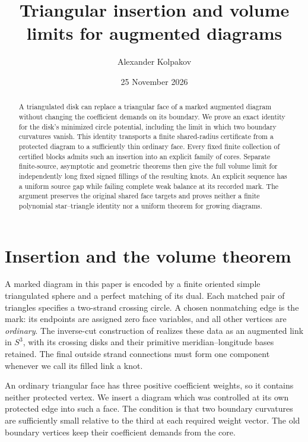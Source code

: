 \documentclass[11pt]{article}
\title{Triangular insertion and volume limits for augmented diagrams}
\author{Alexander Kolpakov}\date{25 November 2026}
\numberwithin{equation}{section}
\theoremstyle{definition}\newtheorem{definition}[theorem]{Definition}
\theoremstyle{remark}\newtheorem{remark}[theorem]{Remark}
\begin{document}
\maketitle
\begin{abstract}
A triangulated disk can replace a triangular face of a marked
augmented diagram without changing the coefficient demands on its
boundary. We prove an exact identity for the disk's minimized circle
potential, including the limit in which two boundary curvatures
vanish. This identity transports a finite shared-radius certificate
from a protected diagram to a sufficiently thin ordinary face.
Every fixed finite collection of certified blocks admits such an
insertion into an explicit family of cores. Separate finite-source,
asymptotic and geometric theorems then give the full volume limit for
independently long fixed signed fillings of the resulting knots.
An explicit sequence has a uniform source gap while failing complete
weak balance at its recorded mark. The argument preserves the
original shared face targets and proves neither a finite polynomial
star--triangle identity nor a uniform theorem for growing diagrams.
\end{abstract}

\section{Insertion and the volume theorem}

A marked diagram in this paper is encoded by a finite oriented simple
triangulated sphere and a perfect matching of its dual. Each matched
pair of triangles specifies a two-strand crossing circle. A chosen
nonmatching edge is the mark: its endpoints are assigned zero face
variables, and all other vertices are \emph{ordinary}. The inverse-cut
construction of \cite[Section 2 and Proposition 2.1]{Marked} realizes
these data as an augmented link in \(S^3\), with its crossing disks and
their primitive meridian--longitude bases retained. The final outside
strand connections must form one component whenever we call its
filled link a knot.

An ordinary triangular face has three positive coefficient weights,
so it contains neither protected vertex. We insert a diagram which was
controlled at its own protected edge into such a face. The condition
is that two boundary curvatures are sufficiently small relative to the
third at each required weight vector. The old boundary vertices keep
their coefficient demands from the core.
\end{document}
